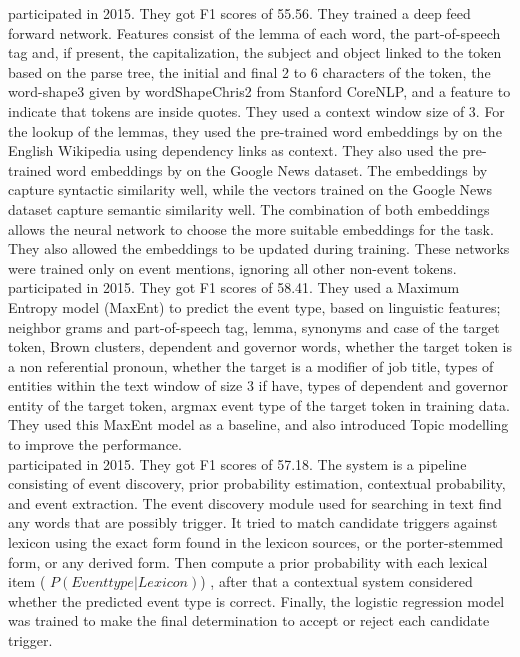 \indent \cite{reimers2015event} participated in 2015. They got F1 scores of 55.56. They trained a deep feed forward network. Features consist of the lemma of each word, the part-of-speech tag and, if present,  the capitalization, the subject and object linked to the token based on the parse tree, the initial and ﬁnal 2 to 6 characters of the token, the word-shape3 given by wordShapeChris2 from Stanford CoreNLP, and a feature to indicate that tokens are inside quotes. They used a context window size of 3. For the lookup of the lemmas, they used the pre-trained word embeddings by \cite{levy2014dependency} on the English Wikipedia using dependency links as context. They also used the pre-trained word embeddings by \cite{mikolov2013distributed} on the Google News dataset. The embeddings by \cite{levy2014dependency} capture syntactic similarity well, while the vectors trained on the Google News dataset capture semantic similarity well. The combination of both embeddings allows the neural network to choose the more suitable embeddings for the task. They also allowed the embeddings to be updated during training. These networks were trained only on event mentions, ignoring all other non-event tokens. \\
\indent \cite{hong2015rpi} participated in 2015. They got F1 scores of 58.41. They used a Maximum Entropy model (MaxEnt) to predict the event type, based on linguistic features; neighbor grams and part-of-speech tag, lemma, synonyms and case of the target token, Brown clusters, dependent and governor words, whether the target token is a non referential pronoun, whether the target is a modiﬁer of job title, types of entities within the text window of size 3 if have, types of dependent and governor entity of the target token, argmax event type of the target token in training data. They used this MaxEnt model as a baseline, and also introduced Topic modelling to improve the performance.\\
\indent \cite{monahan2015populating} participated in 2015. They got F1 scores of 57.18. The system is a pipeline consisting of event discovery, prior probability estimation, contextual probability, and event extraction. The event discovery module used for searching in text find any words that are possibly trigger. It tried to match candidate triggers against lexicon using the exact form found in the lexicon sources, or the porter-stemmed form, or any derived form. Then compute a prior probability with each lexical item ( $P(Eventtype|Lexicon)$) , after that a contextual system considered whether the predicted event type is correct. Finally, the logistic regression model was trained to make the ﬁnal determination to accept or reject each candidate trigger. 
